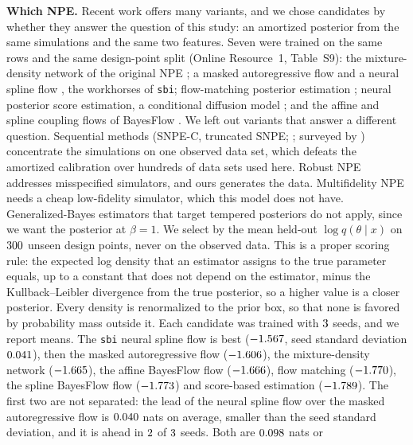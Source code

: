 \documentclass[sn-basic,iicol,pdflatex]{sn-jnl}
\begin{document}
\noindent\textbf{Which NPE.} Recent work offers many variants, and we chose candidates by whether they answer the question of this study: an amortized
posterior from the same simulations and the same two features. Seven were trained on the same rows and the same design-point split
(Online Resource~1, Table~S9): the mixture-density network of the original NPE \citep{papamakarios2016}; a masked autoregressive flow
\citep{papamakarios2017} and a neural spline flow \citep{durkan2019}, the workhorses of \texttt{sbi}; flow-matching posterior estimation
\citep{wildberger2023}; neural posterior score estimation, a conditional diffusion model \citep{sharrock2024}; and the affine and spline
coupling flows of BayesFlow \citep{radev2022,radev2023bayesflow}. We left out variants that answer a different question. Sequential methods
(SNPE-C, truncated SNPE; \citealp{greenberg2019,deistler2022}; surveyed by \citealp{peng2026}) concentrate the simulations on one observed data set, which defeats the amortized
calibration over hundreds of data sets used here. Robust NPE \citep{ward2022} addresses misspecified simulators,
and ours generates the data. Multifidelity NPE \citep{krouglova2026} needs a cheap low-fidelity simulator, which this model does not have. Generalized-Bayes estimators that target tempered posteriors do not apply, since we want the posterior at $\beta=1$.
We select by the mean held-out $\log q(\theta\mid x)$ on $300$ unseen design points, never on the observed data. This is a proper scoring rule: the expected log density
that an estimator assigns to the true parameter equals, up to a constant that does not depend on the estimator, minus the Kullback--Leibler divergence from the true posterior,
so a higher value is a closer posterior. Every density is renormalized to the prior box, so that none is favored by probability mass outside it. Each candidate was trained with $3$ seeds, and we report means. The \texttt{sbi} neural spline flow
is best ($-1.567$, seed standard deviation $0.041$), then the masked autoregressive flow ($-1.606$), the mixture-density network ($-1.665$), the affine BayesFlow flow
($-1.666$), flow matching ($-1.770$), the spline BayesFlow flow ($-1.773$) and score-based estimation ($-1.789$). The first two are not separated: the lead of the neural spline
flow over the masked autoregressive flow is $0.040$ nats on average, smaller than the seed standard deviation, and it is ahead in $2$ of $3$ seeds. Both are $0.098$ nats or
\end{document}
